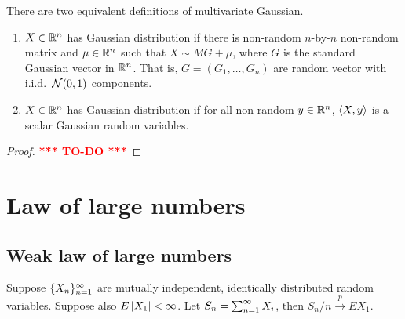 \documentclass[a4paper]{article}
\newcommand{\convp}{\xrightarrow{p}}
\newcommand{\TODO}{\textcolor{red}{\textbf{*** TO-DO ***}}}
\begin{document}
\begin{defi}
  There are two equivalent definitions of multivariate Gaussian.
  \begin{enumerate}
    \item $X \in \mathbb{R}^n$ has Gaussian distribution if there is non-random 
    $n$-by-$n$ non-random matrix and $\mu \in \mathbb{R}^n$ such that 
    $X \sim M G + \mu$, where $G$ is the standard Gaussian vector in $\mathbb{R}^n$.
    That is, $G = (G_1, \dots, G_n)$ are random vector with 
    i.i.d.\ $\mathcal{N}(0, 1)$ components. 

    \item $X \in \mathbb{R}^n$ has Gaussian distribution if for all 
    non-random $y \in \mathbb{R}^n$, $\left\langle X, y \right\rangle$ is a scalar 
    Gaussian random variables.
  \end{enumerate}
\end{defi}

\begin{proof}
  \TODO

\end{proof}

\section{Law of large numbers}

\subsection{Weak law of large numbers}

\begin{thm}
  Suppose $\{ X_n \}_{n=1}^\infty$ are mutually independent, identically 
  distributed random variables. Suppose also $E \left\lvert X_1\right\rvert < \infty$.
  Let $S_n = \sum_{n=1}^\infty X_i$, then $S_n / n \convp E X_1$.
\end{thm}
\end{document}

